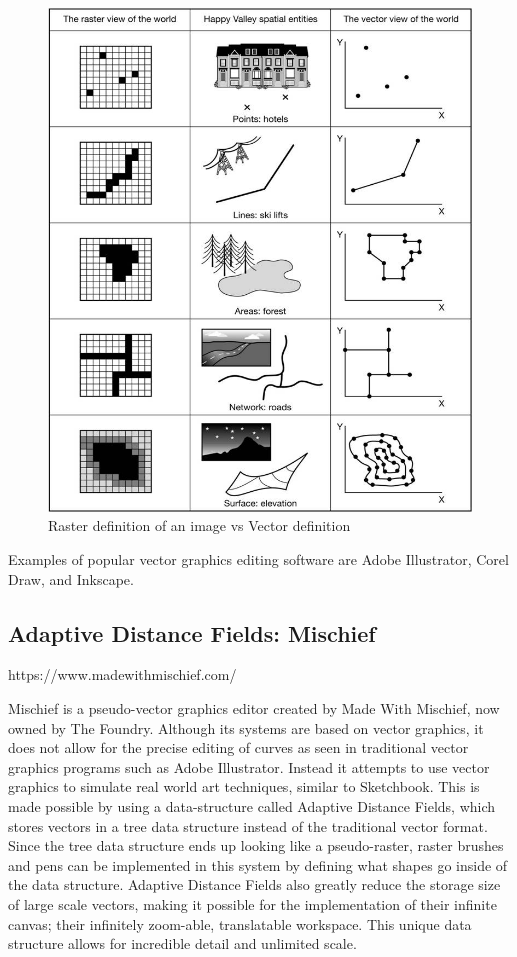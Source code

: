 \documentclass[11pt]{report}
\begin{document}
\begin{figure}
\includegraphics[width=\textwidth]{vector_raster.jpg}
\caption{Raster definition of an image vs Vector definition}
\end{figure}

Examples of popular vector graphics editing software are Adobe Illustrator, Corel Draw, and Inkscape.

\subsection{Adaptive Distance Fields: Mischief} https://www.madewithmischief.com/

Mischief is a pseudo-vector graphics editor created by Made With Mischief, now owned by The Foundry. 
Although its systems are based on vector graphics, it does not allow for the precise editing of curves as seen in traditional vector graphics programs such as Adobe Illustrator. 
Instead it attempts to use vector graphics to simulate real world art techniques, similar to Sketchbook.
This is made possible by using a data-structure called Adaptive Distance Fields, which stores vectors in a tree data structure instead of the traditional vector format.
Since the tree data structure ends up looking like a pseudo-raster, raster brushes and pens can be implemented in this system by defining what shapes go inside of the data structure.
Adaptive Distance Fields also greatly reduce the storage size of large scale vectors, making it possible for the implementation of their infinite canvas; their infinitely zoom-able, translatable workspace. 
This unique data structure allows for incredible detail and unlimited scale.
\end{document}
